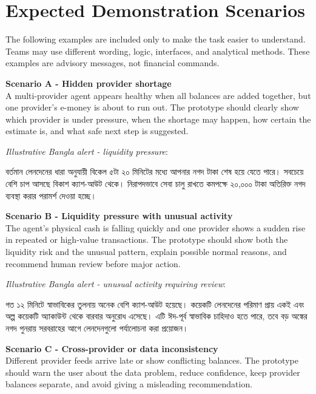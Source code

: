 \documentclass[11pt,a4paper]{article}
\begin{document}
\section{Expected Demonstration Scenarios}
The following examples are included only to make the task easier to understand. Teams may use different wording, logic, interfaces, and analytical methods. These examples are advisory messages, not financial commands.

\textbf{Scenario A - Hidden provider shortage}\\
A multi-provider agent appears healthy when all balances are added together, but one provider's e-money is about to run out. The prototype should clearly show which provider is under pressure, when the shortage may happen, how certain the estimate is, and what safe next step is suggested.

\textit{Illustrative Bangla alert - liquidity pressure}:\\
\begin{bengali}
বর্তমান লেনদেনের ধারা অনুযায়ী বিকেল ৫টা ২০ মিনিটের মধ্যে আপনার নগদ টাকা শেষ হয়ে যেতে পারে। সবচেয়ে বেশি চাপ আসছে বিকাশ ক্যাশ-আউট থেকে। নিরাপদভাবে সেবা চালু রাখতে কমপক্ষে ২০,০০০ টাকা অতিরিক্ত নগদ ব্যবস্থা করার পরামর্শ দেওয়া হচ্ছে।
\end{bengali}

\textbf{Scenario B - Liquidity pressure with unusual activity}\\
The agent's physical cash is falling quickly and one provider shows a sudden rise in repeated or high-value transactions. The prototype should show both the liquidity risk and the unusual pattern, explain possible normal reasons, and recommend human review before major action.

\textit{Illustrative Bangla alert - unusual activity requiring review}:\\
\begin{bengali}
গত ১২ মিনিটে স্বাভাবিকের তুলনায় অনেক বেশি ক্যাশ-আউট হয়েছে। কয়েকটি লেনদেনের পরিমাণ প্রায় একই এবং অল্প কয়েকটি অ্যাকাউন্ট থেকে বারবার অনুরোধ এসেছে। এটি ঈদ-পূর্ব স্বাভাবিক চাহিদাও হতে পারে, তবে বড় অঙ্কের নগদ পুনরায় সরবরাহের আগে লেনদেনগুলো পর্যালোচনা করা প্রয়োজন।
\end{bengali}

\textbf{Scenario C - Cross-provider or data inconsistency}\\
Different provider feeds arrive late or show conflicting balances. The prototype should warn the user about the data problem, reduce confidence, keep provider balances separate, and avoid giving a misleading recommendation.
\end{document}
